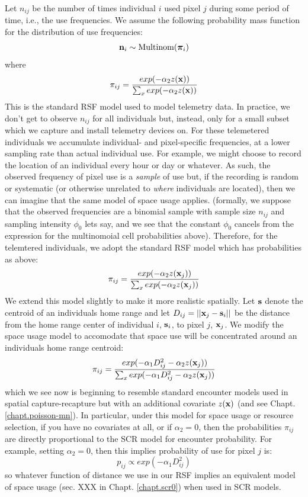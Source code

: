  Let
$n_{ij}$ be the number of times individual $i$ used pixel $j$ during
some period of time, i.e., the use frequencies.  We assume the following probability mass
function for the distribution of use frequencies:
\[
{\bf n}_{i} \sim \mbox{Multinom}({\bm \pi}_{i})
\]
where
\[
 \pi_{ij} = \frac{ exp( -\alpha_{2} z({\bf x}) ) }{ \sum_{x}
   exp(-\alpha_{2} z({\bf x}))}
\]
This is the standard RSF model \citep{manly_etal:2002} used to model
telemetry data.  In practice, we don't get to observe $n_{ij}$ for all
individuals but, instead, only for a small subset which we capture and
install telemetry devices on.  For these telemetered individuals we
accumulate individual- and pixel-specific frequencies, at a lower
sampling rate than actual individual use. For example, we might choose
to record the location of an individual every hour or day or
whatever. As such, the observed frequency of pixel use is a {\it
  sample} of use
but, if the recording is random or systematic (or otherwise unrelated
to {\it where} individuals are located), then we can imagine that the
same model of space usage applies. (formally, we suppose that the
observed frequencies are a binomial sample with sample size $n_{ij}$
and sampling intensity $\phi_{0}$ lets say, and we see that the
constant $\phi_{0}$ cancels from the expression for the multinomoial
cell probabilities above).
Therefore, for the telemtered individuals,
we adopt the standard RSF
model which has probabilities as above:
\[
 \pi_{ij} = \frac{ exp( -\alpha_{2} z({\bf x}_{j}) ) }{ \sum_{x}   exp(-\alpha_{2} z({\bf x}_{j}))}
\]
We extend this model slightly to
make it more realistic spatially. Let ${\bf s}$ denote the centroid of
an individuals home range and let $D_{ij} = ||{\bf x}_{j} - {\bf
  s}_{i}||$ be the distance from the home range center of individual
$i$, ${\bf
  s}_{i}$, to pixel $j$,  ${\bf x}_{j}$. We modify the space usage model to
accomodate that space use will be concentrated
around an individuals home range centroid:
\[
 \pi_{ij} = \frac{ exp( -\alpha_{1} D_{ij}^{2} -\alpha_{2} z({\bf x}_{j}) ) }
{ \sum_{x} exp(-\alpha_{1} D_{ij}^{2} -\alpha_{2} z({\bf x}_{j}))}
\]
which we see now is beginning to resemble standard encounter models
used in spatial capture-recapture but with an additional covariate
$z({\bf x})$ (and see Chapt. \ref{chapt.poisson-mn}).
In particular, under this model for space usage or resource selection,
if you have no covariates at all, or if $\alpha_{2} =
0$, then
the probabilities $\pi_{ij}$ are directly proportional to the SCR
model for encounter probability.
For example, setting $\alpha_{2} = 0$, then this implies probability
of use for pixel $j$ is:
\[
p_{ij} \propto  exp( -\alpha_{1} D_{ij}^{2})
\]
so whatever function of distance we use in our RSF implies an
equivalent model of space usage (sec. XXX in Chapt. \ref{chapt.scr0}) when used in SCR models.

